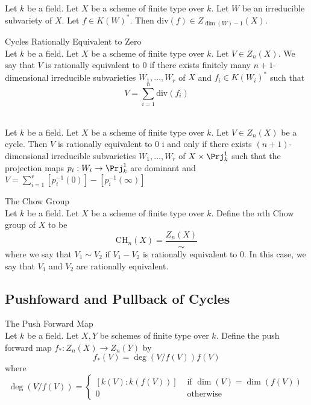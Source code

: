 \documentclass[a4paper]{article}
\begin{document}
\begin{lmm}{}{}\\
Let $k$ be a field. Let $X$ be a scheme of finite type over $k$. Let $W$ be an irreducible subvariety of $X$. Let $f\in K(W)^\ast$. Then $\text{div}(f)\in Z_{\dim(W)-1}(X)$. 
\end{lmm}

\begin{defn}{Cycles Rationally Equivalent to Zero}{}\\
Let $k$ be a field. Let $X$ be a scheme of finite type over $k$. Let $V\in Z_n(X)$. We say that $V$ is rationally equivalent to $0$ if there exists finitely many $n+1$-dimensional irreducible subvarieties $W_1,\dots,W_r$ of $X$ and $f_i\in K(W_i)^\ast$ such that $$V=\sum_{i=1}^n\text{div}(f_i)$$
\end{defn}

\begin{prp}{}{}\\
Let $k$ be a field. Let $X$ be a scheme of finite type over $k$. Let $V\in Z_n(X)$ be a cycle. Then $V$ is rationally equivalent to $0$ i and only if there exists $(n+1)$-dimensional irreducible subvarieties $W_1,\dots,W_r$ of $X\times\Prj_k^1$ such that the projection maps $p_i:W_i\to\Prj_k^1$ are dominant and $V=\sum_{i=1}^r[p_i^{-1}(0)]-[p_i^{-1}(\infty)]$
\end{prp}

\begin{defn}{The Chow Group}{}\\
Let $k$ be a field. Let $X$ be a scheme of finite type over $k$. Define the $n$th Chow group of $X$ to be $$\text{CH}_n(X)=\frac{Z_n(X)}{\sim}$$ where we say that $V_1\sim V_2$ if $V_1-V_2$ is rationally equivalent to $0$. In this case, we say that $V_1$ and $V_2$ are rationally equivalent. 
\end{defn}

\subsection{Pushfoward and Pullback of Cycles}
\begin{defn}{The Push Forward Map}{}\\
Let $k$ be a field. Let $X,Y$ be schemes of finite type over $k$. Define the push forward map $f_\ast:Z_n(X)\to Z_n(Y)$ by $$f_\ast(V)=\deg(V/f(V))f(V)$$ where $$\deg(V/f(V))=\begin{cases}
[k(V):k(f(V))] & \text{ if }\dim(V)=\dim(f(V))\\
0 & \text{ otherwise }
\end{cases}$$
\end{defn}
\end{document}
